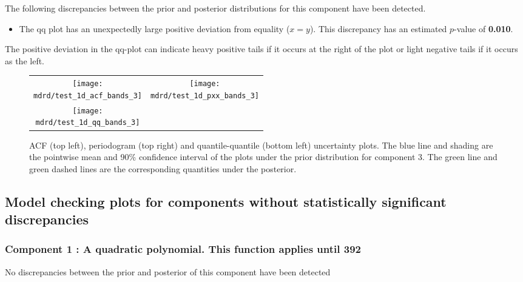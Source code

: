 \documentclass{article} %
\begin{document}
The following discrepancies between the prior and posterior distributions for this component have been detected.

\begin{itemize}

    \item The qq plot has an unexpectedly large positive deviation from equality ($x = y$). This discrepancy has an estimated $p$-value of \textbf{0.010}.
\end{itemize}

The positive deviation in the qq-plot can indicate heavy positive tails if it occurs at the right of the plot or light negative tails if it occurs as the left.


\begin{figure}[H]
\newcommand{\wmgd}{0.5\columnwidth}
\newcommand{\hmgd}{3.0cm}
\newcommand{\mdrd}{test_1d}
\newcommand{\mbm}{\hspace{-0.3cm}}
\begin{tabular}{cc}
\mbm \texttt{[image: \\mdrd/test\_1d\_acf\_bands\_3]} & \texttt{[image: \\mdrd/test\_1d\_pxx\_bands\_3]} \\
\mbm \texttt{[image: \\mdrd/test\_1d\_qq\_bands\_3]}
\end{tabular}
\caption{
ACF (top left), periodogram (top right) and quantile-quantile (bottom left) uncertainty plots.
The blue line and shading are the pointwise mean and 90\% confidence interval of the plots under the prior distribution for component 3.
The green line and green dashed lines are the corresponding quantities under the posterior.}
\label{fig:check3}
\end{figure}

\subsection{Model checking plots for components without statistically significant discrepancies}

\subsubsection{Component 1 : A quadratic polynomial. This function applies until  392}

No discrepancies between the prior and posterior of this component have been detected
\end{document}
